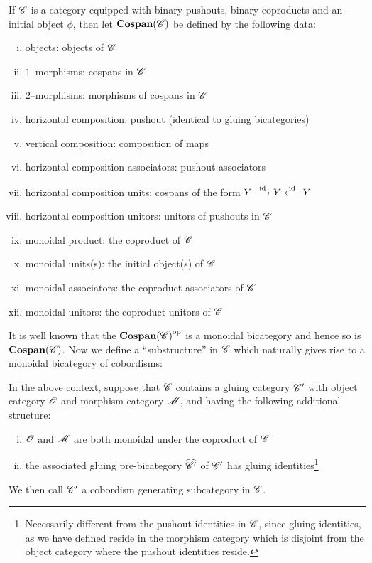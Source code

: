 \documentclass[./Thick_TQFTs_and_Quantum_Information.tex]{subfiles}
\begin{document}
If $\s{C}$ is a category equipped with binary pushouts, binary coproducts and an
initial object $\phi$, then let $\cosp(\s{C})$ be defined by the following data:
\begin{enumerate}[(i)]
\item objects: objects of $\s{C}$
\item $1$--morphisms: cospans in $\s{C}$
\item $2$--morphisms: morphisms of cospans in $\s{C}$
\item horizontal composition: pushout (identical to gluing bicategories)
\item vertical composition: composition of maps
\item horizontal composition associators: pushout associators
\item horizontal composition units: cospans of the form
$Y \to[\id] Y \ot[\id] Y$
\item horizontal composition unitors: unitors of pushouts in $\s{C}$
\item monoidal product: the coproduct of $\s{C}$
\item monoidal units(s): the initial object(s) of $\s{C}$
\item monoidal associators: the coproduct associators of $\s{C}$
\item monoidal unitors: the coproduct unitors of $\s{C}$
\end{enumerate}
It is well known that the $\op{\cosp(\s{C})}$ is a monoidal bicategory and
hence so is $\cosp(\s{C})$. Now we define a ``substructure'' in $\s{C}$ which
naturally gives rise to a monoidal bicategory of cobordisms:
\begin{defn}
In the above context, suppose that $\s{C}$ contains a gluing category
$\s{C}'$ with object category $\s{O}$ and morphism category $\s{M}$, and having
the following additional structure:
\begin{enumerate}[(i)]
\item $\s{O}$ and $\s{M}$ are both monoidal under the coproduct of $\s{C}$
\item the associated gluing pre-bicategory $\wh{\s{C}'}$ of $\s{C}'$ has gluing
identities\footnote{Necessarily different from the pushout identities in
$\s{C}$, since gluing identities, as we have defined reside in the morphism
category which is disjoint from the object category where the pushout identities
reside.}
\end{enumerate}
We then call $\s{C}'$ a cobordism generating subcategory in $\s{C}$.
\end{defn}
\end{document}
